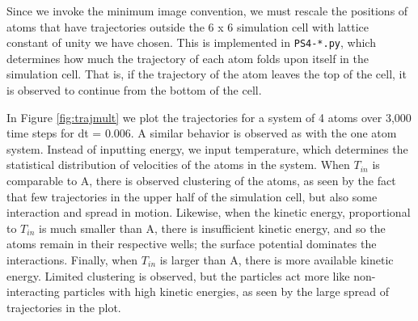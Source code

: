 \documentclass[12pt, oneside]{article}
\begin{document}
Since we invoke the minimum image convention, we must rescale the positions of atoms that have trajectories outside the 6 x 6 simulation cell with lattice constant of unity we have chosen. This is implemented in \verb!PS4-*.py!, which determines how much the trajectory of each atom folds upon itself in the simulation cell. That is, if the trajectory of the atom leaves the top of the cell, it is observed to continue from the bottom of the cell.

In Figure \ref{fig:trajmult} we plot the trajectories for a system of 4 atoms over 3,000 time steps for dt = 0.006. A similar behavior is observed as with the one atom system. Instead of inputting energy, we input temperature, which determines the statistical distribution of velocities of the atoms in the system. When $T_{in}$ is comparable to A, there is observed clustering of the atoms, as seen by the fact that few trajectories in the upper half of the simulation cell, but also some interaction and spread in motion. Likewise, when the kinetic energy, proportional to $T_{in}$ is much smaller than A, there is insufficient kinetic energy, and so the atoms remain in their respective wells; the surface potential dominates the interactions. Finally, when $T_{in}$ is larger than A, there is more available kinetic energy. Limited clustering is observed, but the particles act more like non-interacting particles with high kinetic energies, as seen by the large spread of trajectories in the plot. 
\end{document}
